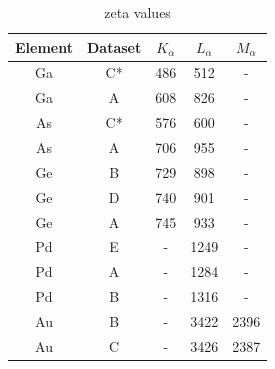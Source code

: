 %

\begin{table}[h!]
	\caption{zeta values}
	\begin{center}
		\begin{tabular}{ccccc}
			Element & Dataset & $K_\alpha$ & $L_\alpha$ & $M_\alpha$ \\ 
			\midrule
			\hline
			Ga  & C* & 486 & 512 & -\\
			Ga  & A  & 608 & 826 & -\\ \hline
			As  & C* & 576 & 600 & -\\
			As  & A  & 706 & 955 & -\\ \hline
			Ge  & B  & 729 & 898 & -\\
			Ge  & D  & 740 & 901 & -\\
			Ge  & A  & 745 & 933 & -\\ \hline
			Pd  & E  & - & 1249 & -\\
			Pd  & A  & - & 1284 & -\\
			Pd  & B  & - & 1316 & -\\ \hline
			Au  & B  & - & 3422 & 2396\\
			Au  & C  & - & 3426 & 2387\\
			\hline
		\end{tabular}
	\end{center}
	\label{tab:non-heated zeta-values}
\end{table}


